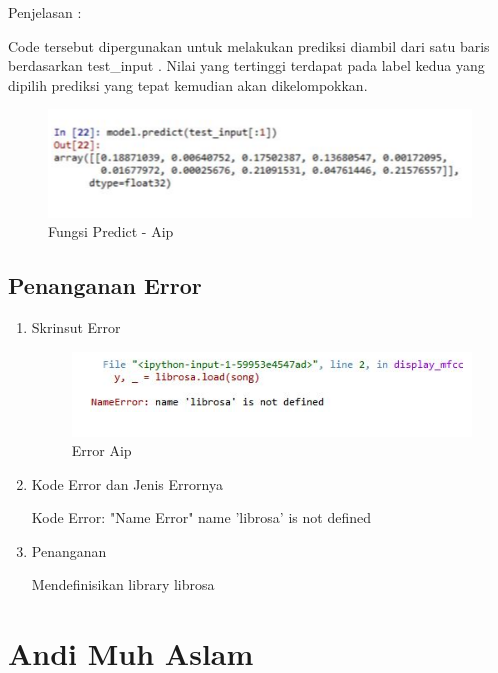 \begin{enumerate}
\begin{itemize}
\par Penjelasan :
\par Code tersebut dipergunakan untuk melakukan prediksi diambil dari satu baris berdasarkan test\_input . Nilai yang tertinggi terdapat pada label kedua yang dipilih prediksi yang tepat kemudian akan dikelompokkan.
\par
\par
\begin{figure}[!hbtp]
\centering
\includegraphics[scale=0.2]{figures/AIP/predict.PNG}
\caption{Fungsi Predict - Aip}
\label{fungsi-predict-Aip}
\end{figure}
\par
\par
\end{itemize}
\end{enumerate}

\subsection{Penanganan Error}
\begin{enumerate}

\item Skrinsut Error
\begin{figure}[!hbtp]
\centering
\includegraphics[scale=0.7]{figures/AIP/erroraip.PNG}
\caption{ Error Aip}
\label{6}
\end{figure}
\item Kode Error dan Jenis Errornya
\par Kode Error: "Name Error" name 'librosa' is not defined
\item Penanganan
\par Mendefinisikan library librosa
\end{enumerate}

\section{Andi Muh Aslam}

